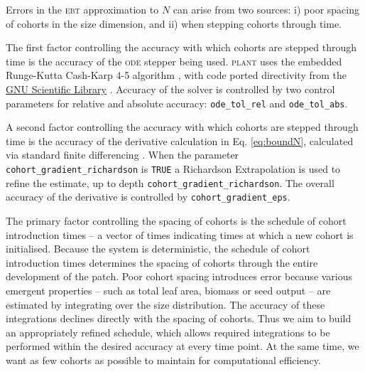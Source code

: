 \documentclass[10pt,twoside]{article}
\newcommand{\plant}{\textsc{plant}}
\begin{document}
Errors in the \textsc{ebt} approximation to \(N\) can arise from two sources: i)
poor spacing of cohorts in the size dimension, and ii) when stepping
cohorts through time.

The first factor controlling the accuracy with which cohorts are stepped
through time is the accuracy of the \textsc{ode} stepper being used. {\plant} uses
the embedded Runge-Kutta Cash-Karp 4-5 algorithm \citep{Cash-1990}, with
code ported directivity from the
\href{http://www.gnu.org/software/gsl/}{GNU Scientific Library}
\citep{Galassi-2009}. Accuracy of the solver is controlled by two
control parameters for relative and absolute accuracy:
\texttt{ode\_tol\_rel} and \texttt{ode\_tol\_abs}.

A second factor controlling the accuracy with which cohorts are stepped
through time is the accuracy of the derivative calculation in Eq.
\ref{eq:boundN}, calculated via standard finite differencing
\citep{Abramowitz-2012}. When the parameter
\texttt{cohort\_gradient\_richardson} is \texttt{TRUE} a Richardson Extrapolation
\citep{Stoer-2002} is used to refine the estimate, up to depth
\texttt{cohort\_gradient\_richardson}. The overall accuracy of the
derivative is controlled by \texttt{cohort\_gradient\_eps}.

The primary factor controlling the spacing of cohorts is the schedule of
cohort introduction times -- a vector of times indicating times at which
a new cohort is initialised. Because the system is deterministic, the
schedule of cohort introduction times determines the spacing of cohorts
through the entire development of the patch. Poor cohort spacing
introduces error because various emergent properties -- such as total
leaf area, biomass or seed output -- are estimated by integrating over
the size distribution. The accuracy of these integrations declines
directly with the spacing of cohorts. Thus we aim to build an
appropriately refined schedule, which allows required integrations to be
performed within the desired accuracy at every time point. At the same
time, we want as few cohorts as possible to maintain for computational
efficiency.
\end{document}
